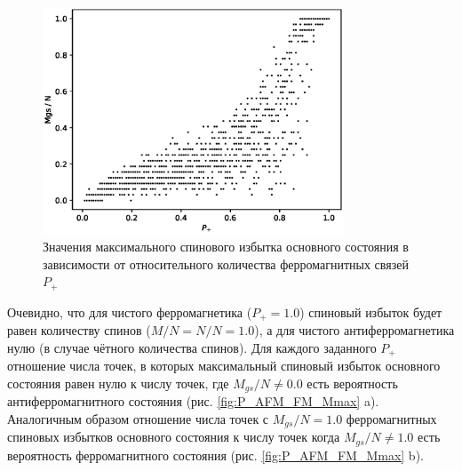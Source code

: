 \documentclass[utf8, babel, sor, jor, amsmath, amssymb, reprint]{elsarticle} %
\begin{document}
\begin{figure}[H]
	\centering
	\includegraphics[width=0.8\textwidth]{images/Mgs(P+).eps}
	\caption{Значения максимального спинового избытка основного состояния в зависимости от относительного количества ферромагнитных связей $P_+$}
	\label{fig:Mgs(P+)}
\end{figure}

Очевидно, что для чистого ферромагнетика ($P_+ = 1.0$) спиновый избыток будет равен количеству спинов ($M/N = N/N = 1.0$), а для чистого антиферромагнетика нулю (в случае чётного количества спинов). Для каждого заданного $P_+$ отношение числа точек, в которых максимальный спиновый избыток основного состояния равен нулю к числу точек, где $M_{gs}/N \neq 0.0$ есть вероятность антиферромагнитного состояния (рис. \ref{fig:P_AFM_FM_Mmax} a). Аналогичным образом отношение числа точек с $M_{gs}/N = 1.0$ ферромагнитных спиновых избытков основного состояния к числу точек когда $M_{gs}/N \neq 1.0$ есть вероятность ферромагнитного состояния (рис. \ref{fig:P_AFM_FM_Mmax} b).
\end{document}
